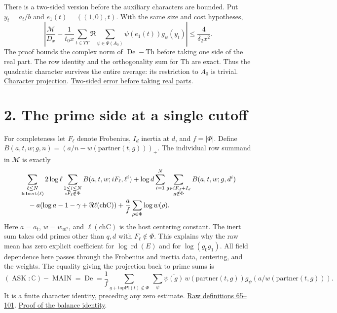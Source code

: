 \documentclass[11pt]{article}
\newcommand{\base}{https://github.com/Deicyde/riemann-hypothesis/blob/e7c8972c701d3396947808ab20cc16dc14623d33/src/}
\newcommand{\pin}[3]{\href{\base#1.lean\##2}{#3}}
\newcommand{\landdir}{Development/AutomorphicArithmetic/DedekindLFunctions/LandauTheorems/}
\newcommand{\sz}{Formalism/SizeWindowBrackets/}
\newcommand{\rd}{\operatorname{rd}}
\newcommand{\Ask}{\operatorname{ASK}}
\newcommand{\Main}{\operatorname{MAIN}}
\newcommand{\De}{\operatorname{De}}
\begin{document}
There is a two-sided version before the auxiliary characters are bounded. Put $y_t=a_t/b$ and $e_1(t)=((1,0),t)$. With the same size and cost hypotheses,
\begin{equation}
 \left|\frac{\mathcal M}{D_x}
 -\frac{1}{t_0 x}\sum_{t\in TT}\Re\sum_{\psi\in\Psi(A_0)}
           \psi(e_1(t))g_\psi(y_t)\right|\le\frac{4}{\delta_2 x^2}.
 \label{eq:proj}
\end{equation}
The proof bounds the complex norm of $\De-\mathrm{Th}$ before taking one side of the real part. The row identity and the orthogonality sum for $\mathrm{Th}$ are exact.
Thus the quadratic character survives the entire average: its restriction to $A_0$ is trivial.
\pin{\landdir ChCore}{L28-L71}{Character projection}.
\pin{\landdir ChCore}{L105-L151}{Two-sided error before taking real parts}.

\newpage
\section*{2. The prime side at a single cutoff}
For completeness let $F_\ell$ denote Frobenius, $I_d$ inertia at $d$, and $f=|\Phi|$. Define $B(a,t,w;g,n)=(a/n-w(\mathrm{partner}(t,g)))_+$.
The individual row summand in $\mathcal M$ is exactly
\begin{align*}
 &\sum_{\substack{\ell\le N\\\mathrm{IsInert}(\ell)}}2\log\ell
   \sum_{\substack{1\le i\le N\\ iF_\ell\notin\Phi}} B(a,t,w;iF_\ell,\ell^i)
 +\log d\sum_{i=1}^N\sum_{\substack{g\in iF_d+ I_d\\g\notin\Phi}}B(a,t,w;g,d^i)\\
 &\hspace{4mm} -a(\log a-1-\gamma+\Re\ell(\mathrm{chC}))
     +\frac af\sum_{\rho\in\Phi}\log w(\rho).
\end{align*}
Here $a=a_t$, $w=w_{u i'}$, and $\ell(\mathrm{chC})$ is the host centering constant.
The inert sum takes odd primes other than $q,d$ with $F_\ell\notin\Phi$. This explains why the raw mean has zero explicit coefficient for $\log\rd(E)$ and for $\log(g_0g_1)$. All field dependence here passes through the Frobenius and inertia data, centering, and the weights.
The equality giving the projection back to prime sums is
\[
 (\Ask:\mathbb C)-\Main=\De
 =\frac1f\!\sum_{g+\mathrm{topPl}(t)\notin\Phi}\ \sum_\psi
    \overline{\psi(g)}\,w(\mathrm{partner}(t,g))
             g_\psi\!\left(a/w(\mathrm{partner}(t,g))\right).
\]
It is a finite character identity, preceding any zero estimate.
\pin{\sz FirstPrimeNeSecondPrime}{L65-L101}{Raw definitions 65--101}.
\pin{\landdir ChBalance}{L200-L261}{Proof of the balance identity}.
\end{document}
